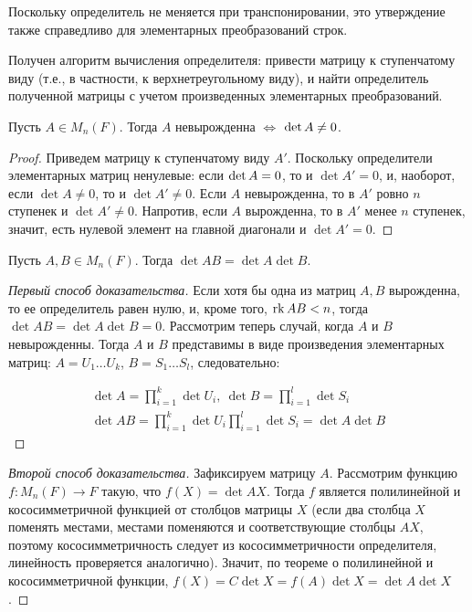 \begin{note}
	Поскольку определитель не меняется при транспонировании, это утверждение также справедливо для элементарных преобразований строк.
\end{note}

\begin{corollary}
	Получен алгоритм вычисления определителя: привести матрицу к ступенчатому виду (т.\:е., в частности, к верхнетреугольному виду), и найти определитель полученной матрицы с учетом произведенных элементарных преобразований.
\end{corollary}

\begin{theorem}
	Пусть $A \in M_n(F)$. Тогда $A$ невырожденна $\Leftrightarrow$ $\det{A} \hm{\ne} 0$.
\end{theorem}

\begin{proof}
	Приведем матрицу к ступенчатому виду $A'$. Поскольку определители элементарных матриц ненулевые: если $\det{A} \hm{=} 0$, то и $\det{A'} = 0$, и, наоборот, если $\det{A} \ne 0$, то и $\det{A'} \ne 0$. Если $A$ невырожденна, то в $A'$ ровно $n$ ступенек и $\det{A'} \ne 0$. Напротив, если $A$ вырожденна, то в $A'$ менее $n$ ступенек, значит, есть нулевой элемент на главной диагонали и $\det{A'} = 0$.
\end{proof}

\begin{theorem}
	Пусть $A, B \in M_n(F)$. Тогда $\det{AB} = \det{A}\det{B}$.
\end{theorem}

\begin{proof}[Первый способ доказательства]
	Если хотя бы одна из матриц $A, B$ вырожденна, то ее определитель равен нулю, и, кроме того, $\rk{AB} \hm{<} n$, тогда $\det{AB} = \det{A}\det{B} = 0$. Рассмотрим теперь случай, когда $A$ и $B$ невырожденны. Тогда $A$ и $B$ представимы в виде произведения элементарных матриц: $A = U_1\dots U_k$, $B = S_1\dots S_l$, следовательно:
	
	\begin{gather*}
		\det{A} = \prod_{i = 1}^{k}\det{U_i},~\det{B} = \prod_{i = 1}^{l}\det{S_i}\\
		\det{AB} = \prod_{i = 1}^{k}\det{U_i}\prod_{i = 1}^{l}\det{S_i} = \det{A}\det{B}
	\end{gather*}
\end{proof}

\begin{proof}[Второй способ доказательства]
	Зафиксируем матрицу $A$. Рассмотрим функцию $f : M_n(F) \rightarrow F$ такую, что $f(X) = \det{AX}$. Тогда $f$ является полилинейной и кососимметричной функцией от столбцов матрицы $X$ (если два столбца $X$ поменять местами, местами поменяются и соответствующие столбцы $AX$, поэтому кососимметричность следует из кососимметричности определителя, линейность проверяется аналогично). Значит, по теореме о полилинейной и кососимметричной функции, $f(X) = C\det{X} = f(A)\det{X} = \det{A}\det{X}$.
\end{proof}


